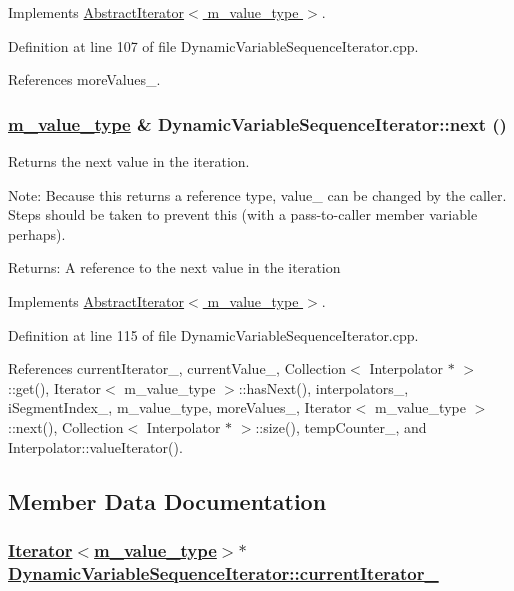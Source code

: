 Implements \hyperlink{classAbstractIterator_a1}{Abstract\-Iterator$<$ m\_\-value\_\-type $>$}.

Definition at line 107 of file Dynamic\-Variable\-Sequence\-Iterator.cpp.

References more\-Values\_\-.\hypertarget{classDynamicVariableSequenceIterator_a4}{
\subsubsection[next]{\setlength{\rightskip}{0pt plus 5cm}\hyperlink{Types_8h_a3}{m\_\-value\_\-type} \& Dynamic\-Variable\-Sequence\-Iterator::next ()}}
\label{classDynamicVariableSequenceIterator_a4}


Returns the next value in the iteration. \begin{Desc}
\item[Note:]Because this returns a reference type, value\_\- can be changed by the caller. Steps should be taken to prevent this (with a pass-to-caller member variable perhaps). \end{Desc}
\begin{Desc}
\item[Returns:]A reference to the next value in the iteration \end{Desc}


Implements \hyperlink{classAbstractIterator_a2}{Abstract\-Iterator$<$ m\_\-value\_\-type $>$}.

Definition at line 115 of file Dynamic\-Variable\-Sequence\-Iterator.cpp.

References current\-Iterator\_\-, current\-Value\_\-, Collection$<$ Interpolator $\ast$ $>$::get(), Iterator$<$ m\_\-value\_\-type $>$::has\-Next(), interpolators\_\-, i\-Segment\-Index\_\-, m\_\-value\_\-type, more\-Values\_\-, Iterator$<$ m\_\-value\_\-type $>$::next(), Collection$<$ Interpolator $\ast$ $>$::size(), temp\-Counter\_\-, and Interpolator::value\-Iterator().

\subsection{Member Data Documentation}
\hypertarget{classDynamicVariableSequenceIterator_r2}{
\subsubsection[currentIterator\_\-]{\setlength{\rightskip}{0pt plus 5cm}\hyperlink{classIterator}{Iterator}$<$\hyperlink{Types_8h_a3}{m\_\-value\_\-type}$>$$\ast$ \hyperlink{classDynamicVariableSequenceIterator_r2}{Dynamic\-Variable\-Sequence\-Iterator::current\-Iterator\_\-}}}
\label{classDynamicVariableSequenceIterator_r2}


